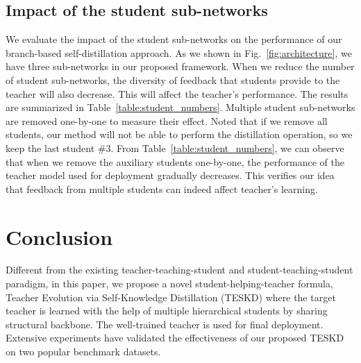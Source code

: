 \documentclass[letterpaper]{article} %
\begin{document}
\begin{table}
	\begin{center}
    	\caption{
    		Ablation Study: Impact of the student sub-networks with ResNet-18 on CIFAR-100 dataset.
    	}
		\label{table:student_numbers}
	\end{center}
\end{table}


\subsection{Impact of the student sub-networks}

We evaluate the impact of the student sub-networks on the performance of our branch-based self-distillation approach. As we shown in Fig.~\ref{fig:architecture}, we have three sub-networks in our proposed framework. When we reduce the number of student sub-networks, the diversity of feedback that students provide to the teacher will also decrease. This will affect the teacher's performance. The results are summarized in Table~\ref{table:student_numbers}. Multiple student sub-networks are removed one-by-one to measure their effect. Noted that if we remove all students, our method will not be able to perform the distillation operation, so we keep the last student $\#3$. From Table~\ref{table:student_numbers}, we can observe that when we remove the auxiliary students one-by-one, the performance of the teacher model used for deployment gradually decreases. This verifies our idea that feedback from multiple students can indeed affect teacher's learning.


\section{Conclusion}

Different from the existing teacher-teaching-student and student-teaching-student paradigm, in this paper, we propose a novel student-helping-teacher formula, Teacher Evolution via Self-Knowledge Distillation (TESKD) where the target  teacher is learned with the help of multiple hierarchical students by sharing structural backbone. The well-trained teacher is used for final deployment.
Extensive experiments have validated the effectiveness of our proposed TESKD on two popular benchmark datasets.



\end{document}
